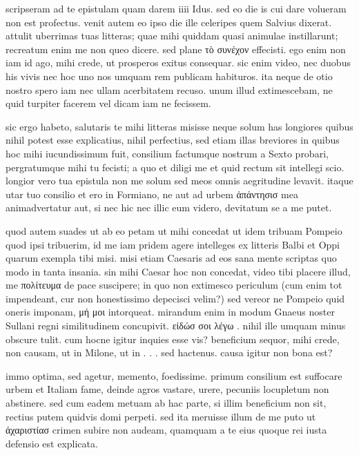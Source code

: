


 scripseram ad te epistulam quam darem iiii Idus. sed eo die is cui dare volueram non est profectus. venit autem eo ipso die ille celeripes quem Salvius dixerat. attulit uberrimas tuas litteras; quae mihi quiddam quasi animulae instillarunt; recreatum enim me non queo dicere. sed plane τὸ συνέχον effecisti. ego enim non iam id ago, mihi crede, ut prosperos exitus consequar. sic enim video, nec duobus his vivis nec hoc uno nos umquam rem publicam habituros. ita neque de otio nostro spero iam nec ullam acerbitatem recuso. unum illud extimescebam, ne quid turpiter facerem vel dicam iam ne fecissem.

 sic ergo habeto, salutaris te mihi litteras misisse neque solum has longiores quibus nihil potest esse explicatius, nihil perfectius, sed etiam illas breviores in quibus hoc mihi iucundissimum fuit, consilium factumque nostrum a Sexto probari, pergratumque mihi tu fecisti; a quo et diligi me et quid rectum sit intellegi scio. longior vero tua epistula non me solum sed meos omnis aegritudine levavit. itaque utar tuo consilio et ero in Formiano, ne aut ad urbem ἀπάντησισ mea animadvertatur aut, si nec hic nec illic eum videro, devitatum se a me putet.

 quod autem suades ut ab eo petam ut mihi concedat ut idem tribuam Pompeio quod ipsi tribuerim, id me iam pridem agere intelleges ex litteris Balbi et Oppi quarum exempla tibi misi. misi etiam Caesaris ad eos sana mente scriptas quo modo in tanta insania. sin mihi Caesar hoc non concedat, video tibi placere illud, me πολίτευμα de pace suscipere; in quo non extimesco periculum (cum enim tot impendeant, cur non honestissimo depecisci velim?) sed vereor ne Pompeio quid oneris imponam, μή μοι intorqueat. mirandum enim in modum Gnaeus noster Sullani regni similitudinem concupivit. εἰδώσ σοι λέγω . nihil ille umquam minus obscure tulit. cum hocne igitur inquies esse vis? beneficium sequor, mihi crede, non causam, ut in Milone, ut in . . . sed hactenus. causa igitur non bona est?

 immo optima, sed agetur, memento, foedissime. primum consilium est suffocare urbem et Italiam fame, deinde agros vastare, urere, pecuniis locupletum non abstinere. sed cum eadem metuam ab hac parte, si illim beneficium non sit, rectius putem quidvis domi perpeti. sed ita meruisse illum de me puto ut ἀχαριστίασ crimen subire non audeam, quamquam a te eius quoque rei iusta defensio est explicata.

